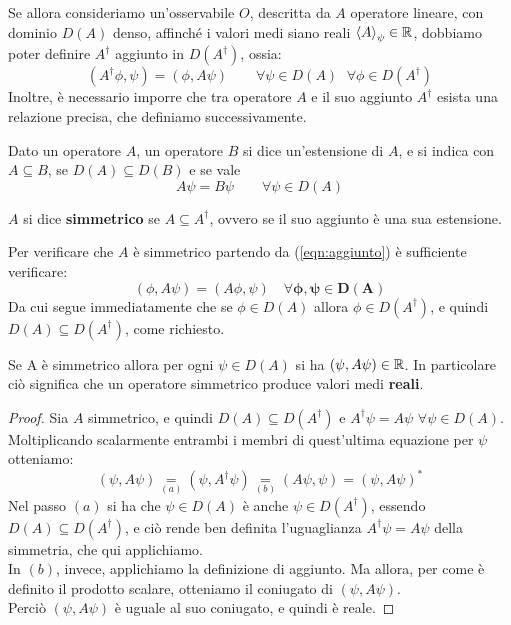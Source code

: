 \documentclass[FisicaTeorica.tex]{subfiles}
\begin{document}
	Se allora consideriamo un'osservabile $O$, descritta da $A$ operatore lineare, con dominio $D(A)$ denso, affinché i valori medi siano reali $\left\langle A\right\rangle_\psi\in\mathbb{R}$, dobbiamo poter definire $A^\dag$ aggiunto in $D(A^\dag)$, ossia:
\begin{equation}
(A^\dag \phi, \psi) = (\phi, A \psi) \qquad \forall \psi \in D\left(A\right) \, \ \ \forall \phi \in D\left(A^\dag\right)
\label{eqn:aggiunto}
\end{equation}
Inoltre, è necessario imporre che tra operatore $A$ e il suo aggiunto $A^\dag$ esista una relazione precisa, che definiamo successivamente.
\begin{dfn}
Dato un operatore $A$, un operatore $B$ si dice un'estensione di $A$, e si indica con $A \subseteq B$, se $D(A) \subseteq D(B)$ e se vale
\[
A \psi = B \psi \qquad \forall \psi \in D(A)
\]
\end{dfn}
\begin{dfn}
$A$ si dice \textbf{simmetrico} se $A \subseteq A^\dag$, ovvero se il suo aggiunto è una sua estensione.
\end{dfn}
Per verificare che $A$ è simmetrico partendo da (\ref{eqn:aggiunto}) è sufficiente verificare:
\[ 
\left(\phi,A\psi\right)=\left(A\phi,\psi\right)\quad \bm{\forall \phi, \psi \in D\left(A\right)}
\]
Da cui segue immediatamente che se $\phi \in D\left(A\right)$ allora $\phi \in D\left(A^\dag\right)$, e quindi $D(A)\subseteq D(A^\dag)$, come richiesto.

\begin{thm}
Se A è simmetrico allora per ogni $\psi \in D(A)$ si ha  $\left(\psi,A\psi\right)\in \mathbb{R}$. In particolare ciò significa che un operatore simmetrico produce valori medi \textbf{reali}.
\end{thm}
\begin{proof}
Sia $A$ simmetrico, e quindi $D(A) \subseteq D(A^\dag)$ e $A^\dag \psi = A\psi$ $\forall \psi \in D(A)$. Moltiplicando scalarmente entrambi i membri di quest'ultima equazione per $\psi$ otteniamo:
\[
(\psi, A\psi) \underset{(a)}{=} (\psi,A^\dag \psi) \underset{(b)}{=} (A\psi, \psi) = (\psi,A\psi)^*
\]
Nel passo $(a)$ si ha che $\psi \in D(A)$ è anche $\psi \in D(A^\dag)$, essendo $D(A)\subseteq D(A^\dag)$, e ciò rende ben definita l'uguaglianza $A^\dag \psi = A\psi$ della simmetria, che qui applichiamo.\\
In $(b)$, invece, applichiamo la definizione di aggiunto. Ma allora, per come è definito il prodotto scalare, otteniamo il coniugato di $(\psi,A\psi)$.\\
Perciò $(\psi,A\psi)$ è uguale al suo coniugato, e quindi è reale.
\end{proof}
\end{document}
